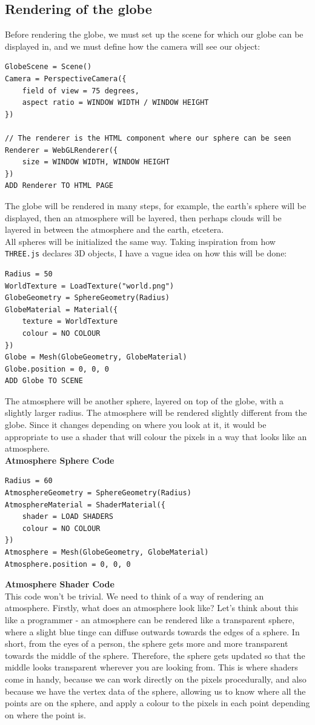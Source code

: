 \subsection{Rendering of the globe}
Before rendering the globe, we must set up the scene for which our globe can be displayed in, and we must define how the camera will see our object:
\begin{lstlisting}
GlobeScene = Scene()
Camera = PerspectiveCamera({
	field of view = 75 degrees,
	aspect ratio = WINDOW WIDTH / WINDOW HEIGHT
})

// The renderer is the HTML component where our sphere can be seen
Renderer = WebGLRenderer({
	size = WINDOW WIDTH, WINDOW HEIGHT
})
ADD Renderer TO HTML PAGE
\end{lstlisting}
The globe will be rendered in many steps, for example, the earth's sphere will be displayed, then an atmosphere will be layered, then perhaps clouds will be layered in between the atmosphere and the earth, etcetera. \\
All spheres will be initialized the same way. Taking inspiration from how \verb|THREE.js| declares 3D objects, I have a vague idea on how this will be done:
\begin{lstlisting}
Radius = 50
WorldTexture = LoadTexture("world.png")
GlobeGeometry = SphereGeometry(Radius)
GlobeMaterial = Material({
	texture = WorldTexture
	colour = NO COLOUR
})
Globe = Mesh(GlobeGeometry, GlobeMaterial)
Globe.position = 0, 0, 0
ADD Globe TO SCENE
\end{lstlisting}
The atmosphere will be another sphere, layered on top of the globe, with a slightly larger radius. The atmosphere will be rendered slightly different from the globe. Since it changes depending on where you look at it, it would be appropriate to use a shader that will colour the pixels in a way that looks like an atmosphere. \\
\textbf{Atmosphere Sphere Code}
\begin{lstlisting}
Radius = 60
AtmosphereGeometry = SphereGeometry(Radius)
AtmosphereMaterial = ShaderMaterial({
	shader = LOAD SHADERS
	colour = NO COLOUR
})
Atmosphere = Mesh(GlobeGeometry, GlobeMaterial)
Atmosphere.position = 0, 0, 0
\end{lstlisting}
\textbf{Atmosphere Shader Code} \\
This code won't be trivial. We need to think of a way of rendering an atmosphere. Firstly, what does an atmosphere look like? Let's think about this like a programmer - an atmosphere can be rendered like a transparent sphere, where a slight blue tinge can diffuse outwards towards the edges of a sphere. In short, from the eyes of a person, the sphere gets more and more transparent towards the middle of the sphere. Therefore, the sphere gets updated so that the middle looks transparent wherever you are looking from. This is where shaders come in handy, because we can work directly on the pixels procedurally, and also because we have the vertex data of the sphere, allowing us to know where all the points are on the sphere, and apply a colour to the pixels in each point depending on where the point is. \\
